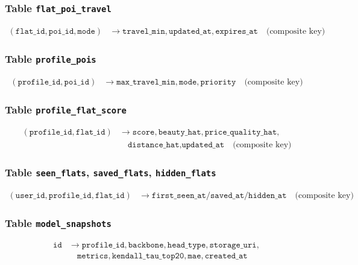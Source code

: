 \documentclass[12pt,a4paper]{article}
\begin{document}
\subsubsection{Table \texttt{flat\_poi\_travel}}
\begin{align}
    (\texttt{flat\_id}, \texttt{poi\_id}, \texttt{mode}) &\rightarrow \texttt{travel\_min}, \texttt{updated\_at}, \texttt{expires\_at} \quad \text{(composite key)}
\end{align}

\subsubsection{Table \texttt{profile\_pois}}
\begin{align}
    (\texttt{profile\_id}, \texttt{poi\_id}) &\rightarrow \texttt{max\_travel\_min}, \texttt{mode}, \texttt{priority} \quad \text{(composite key)}
\end{align}

\subsubsection{Table \texttt{profile\_flat\_score}}
\begin{align}
    (\texttt{profile\_id}, \texttt{flat\_id}) &\rightarrow \texttt{score}, \texttt{beauty\_hat}, \texttt{price\_quality\_hat}, \\
    &\quad \texttt{distance\_hat}, \texttt{updated\_at} \quad \text{(composite key)}
\end{align}

\subsubsection{Table \texttt{seen\_flats}, \texttt{saved\_flats}, \texttt{hidden\_flats}}
\begin{align}
    (\texttt{user\_id}, \texttt{profile\_id}, \texttt{flat\_id}) &\rightarrow \texttt{first\_seen\_at} / \texttt{saved\_at} / \texttt{hidden\_at} \quad \text{(composite key)}
\end{align}

\subsubsection{Table \texttt{model\_snapshots}}
\begin{align}
    \texttt{id} &\rightarrow \texttt{profile\_id}, \texttt{backbone}, \texttt{head\_type}, \texttt{storage\_uri}, \\
    &\quad \texttt{metrics}, \texttt{kendall\_tau\_top20}, \texttt{mae}, \texttt{created\_at}
\end{align}
\end{document}
